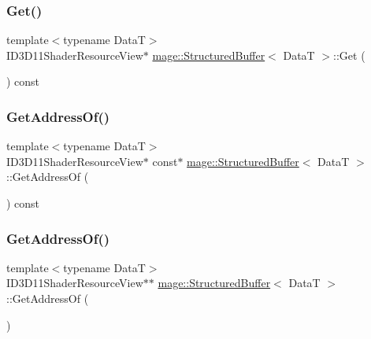 \subsubsection{\texorpdfstring{Get()}{Get()}}
{\footnotesize\ttfamily template$<$typename DataT$>$ \\
I\+D3\+D11\+Shader\+Resource\+View$\ast$ \hyperlink{structmage_1_1_structured_buffer}{mage\+::\+Structured\+Buffer}$<$ DataT $>$\+::Get (\begin{DoxyParamCaption}{ }\end{DoxyParamCaption}) const}

\hypertarget{structmage_1_1_structured_buffer_a10dd9e717022b574d83fd29fa4f10537}{}\label{structmage_1_1_structured_buffer_a10dd9e717022b574d83fd29fa4f10537} 
\subsubsection{\texorpdfstring{Get\+Address\+Of()}{GetAddressOf()}\hspace{0.1cm}{\footnotesize\ttfamily [1/2]}}
{\footnotesize\ttfamily template$<$typename DataT$>$ \\
I\+D3\+D11\+Shader\+Resource\+View$\ast$ const$\ast$ \hyperlink{structmage_1_1_structured_buffer}{mage\+::\+Structured\+Buffer}$<$ DataT $>$\+::Get\+Address\+Of (\begin{DoxyParamCaption}{ }\end{DoxyParamCaption}) const}

\hypertarget{structmage_1_1_structured_buffer_a3ca7d25f7e04797ee2ae8acefff1cab8}{}\label{structmage_1_1_structured_buffer_a3ca7d25f7e04797ee2ae8acefff1cab8} 
\subsubsection{\texorpdfstring{Get\+Address\+Of()}{GetAddressOf()}\hspace{0.1cm}{\footnotesize\ttfamily [2/2]}}
{\footnotesize\ttfamily template$<$typename DataT$>$ \\
I\+D3\+D11\+Shader\+Resource\+View$\ast$$\ast$ \hyperlink{structmage_1_1_structured_buffer}{mage\+::\+Structured\+Buffer}$<$ DataT $>$\+::Get\+Address\+Of (\begin{DoxyParamCaption}{ }\end{DoxyParamCaption})}

